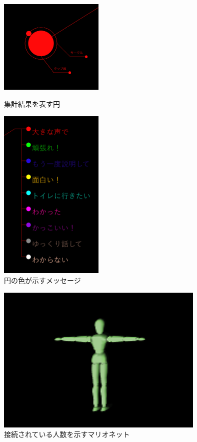 \documentclass{funthesis}
\begin{document}
\begin{figure}[H]
 \begin{minipage}{0.5\hsize}
  \begin{center}
  \includegraphics[width=50mm]{./img/svcircle.png}
  \end{center}
  \caption{集計結果を表す円}
  \label{svcircle}
 \end{minipage}
 \begin{minipage}{0.5\hsize}
  \begin{center}
  \includegraphics[width=50mm]{./img/svmessagearea.png}
  \end{center}
  \caption{円の色が示すメッセージ}
  \label{svmessage}
  \end{minipage}
\end{figure}

\begin{figure}[H]
 \begin{center}
  \includegraphics[width=100mm]{./img/marionet.png}
 \end{center}
 \caption{接続されている人数を示すマリオネット}
 \label{mario}
\end{figure}
\end{document}
